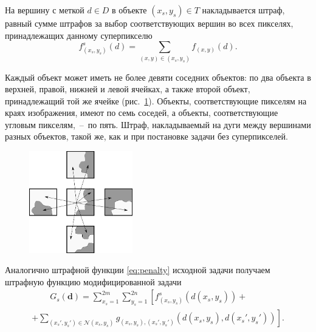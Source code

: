 \documentclass{ConfFTI}
\begin{document}
На вершину с меткой $d \in D$ в объекте $\left( x_s, y_s \right) \in T$
накладывается штраф,
равный сумме штрафов за выбор соответствующих вершин во всех пикселях,
принадлежащих данному суперпикселю
\begin{equation*}
    f_{\left(x_s, y_s \right)}^s \left(d \right) =
    \sum \limits_{\left(x, y \right) \in \left(x_s, y_s \right)}
        f_{\left(x, y \right)} \left(d \right).
\end{equation*}

Каждый объект может иметь не более девяти соседних объектов:
по два объекта в верхней,
правой, нижней и левой ячейках, а также второй объект,
принадлежащий той же ячейке (рис.~\ref{fig:neighbors:superpixel}).
Объекты, соответствующие пикселям на краях изображения,
имеют по семь соседей, а объекты,
соответствующие угловым пикселям,~--~по пять.
Штраф, накладываемый на дуги между вершинами разных объектов, такой же,
как и при постановке задачи без суперпикселей.

\begin{figure}[h]
  \centering
  \includegraphics[width=0.4\textwidth]{images/neighbours_superpixel}
  \label{fig:neighbors:superpixel}
\end{figure}

Аналогично штрафной функции \eqref{eq:penalty} исходной задачи
получаем штрафную функцию модифицированной задачи
\begin{equation*}
\begin{gathered}
    \phantom{\sum \limits_{\mathcal{N}}}
    G_s \left(\pmb{d} \right) =
    \sum \limits_{x_s = 1}^{2m}
        \sum \limits_{y_s = 1}^{2n}
            \left[
                f_{\left(x_s, y_s \right)}^s \left(d \left(x_s, y_s \right) \right) +
                \phantom{\sum \limits_{\mathcal{N}}} \right. \\
                + \left.
                \sum \limits_{\left(x_s', y_s' \right) \in \mathcal{N}\left(x_s, y_s \right)}
                g_{\left(x_s, y_s \right), \left(x_s', y_s' \right)} \left(
                    d \left(x_s, y_s\right), d\left(x_s', y_s' \right)
                \right)
            \right].
\end{gathered}
\end{equation*}
\end{document}
